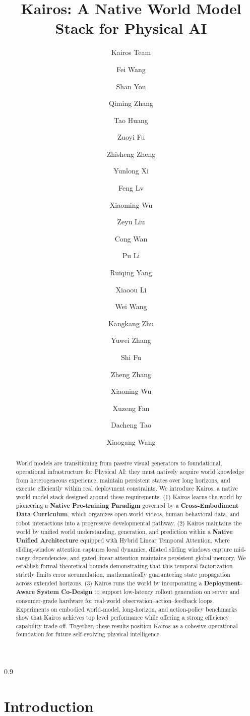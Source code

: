 \documentclass{llmxive}
\title{Kairos: A Native World Model Stack for Physical AI}
\author{Kairos Team \and Fei Wang \and Shan You \and Qiming Zhang \and Tao Huang \and Zuoyi Fu \and Zhisheng Zheng \and Yunlong Xi \and Feng Lv \and Xiaoming Wu \and Zeyu Liu \and Cong Wan \and Pu Li \and Ruiqing Yang \and Xiaoou Li \and Wei Wang \and Kangkang Zhu \and Yuwei Zhang \and Shi Fu \and Zheng Zhang \and Xiaoning Wu \and Xuzeng Fan \and Dacheng Tao \and Xiaogang Wang}
\begin{document}
\maketitle
\begin{abstract}
World models are transitioning from passive visual generators to foundational, operational infrastructure for Physical AI: they must natively acquire world knowledge from heterogeneous experience, maintain persistent states over long horizons, and execute efficiently within real deployment constraints. We introduce Kairos, a native world model stack designed around these requirements. 
(1) Kairos learns the world by pioneering a \textbf{Native Pre-training Paradigm} governed by a \textbf{Cross-Embodiment Data Curriculum}, which organizes open-world videos, human behavioral data, and robot interactions into a progressive developmental pathway. 
(2) Kairos maintains the world by unified world understanding, generation, and prediction within a \textbf{Native Unified Architecture} equipped with Hybrid Linear Temporal Attention, where sliding-window attention captures local dynamics, dilated sliding windows capture mid-range dependencies, and gated linear attention maintains persistent global memory. We establish formal theoretical bounds demonstrating that this temporal factorization strictly limits error accumulation, mathematically guaranteeing state propagation across extended horizons. 
(3) Kairos runs the world by incorporating a \textbf{Deployment-Aware System Co-Design} to support low-latency rollout generation on server and consumer-grade hardware for real-world observation--action--feedback loops. 
Experiments on embodied world-model, long-horizon, and action-policy benchmarks show that Kairos achieves top level performance while offering a strong efficiency–capability trade-off. Together, these results position Kairos as a cohesive operational foundation for future self-evolving physical intelligence.
\vspace{10mm}
\end{abstract}
\begin{spacing}{0.9}
\tableofcontents
\end{spacing}








\section{Introduction}
\end{document}
